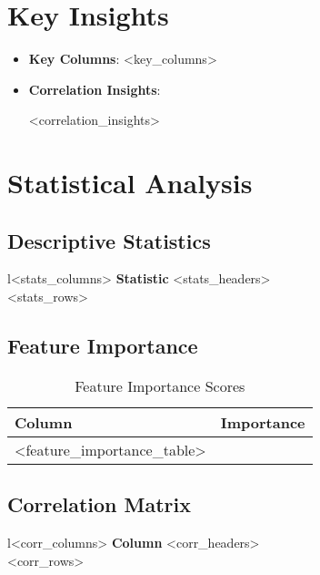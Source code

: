 \documentclass[a4paper,12pt]{article}
\begin{document}
\section{Key Insights}
\begin{itemize}
    \item \textbf{Key Columns}: <key_columns>
    \item \textbf{Correlation Insights}: 
    \begin{itemize}
        <correlation_insights>
    \end{itemize}
\end{itemize}

\section{Statistical Analysis}
\subsection{Descriptive Statistics}
\begin{table}[h]
    \centering
    \begin{tabular}{l<stats_columns>}
        \toprule
        \textbf{Statistic} <stats_headers> \\
        \midrule
        <stats_rows>
        \bottomrule
    \end{tabular}
    \caption{Descriptive Statistics for Numeric Columns}
\end{table}

\subsection{Feature Importance}
\begin{table}[h]
    \centering
    \begin{tabular}{lc}
        \toprule
        \textbf{Column} & \textbf{Importance} \\
        \midrule
        <feature_importance_table>
        \bottomrule
    \end{tabular}
    \caption{Feature Importance Scores}
\end{table}

\subsection{Correlation Matrix}
\begin{table}[h]
    \centering
    \begin{tabular}{l<corr_columns>}
        \toprule
        \textbf{Column} <corr_headers> \\
        \midrule
        <corr_rows>
        \bottomrule
    \end{tabular}
    \caption{Pearson Correlation Matrix}
\end{table}
\end{document}
